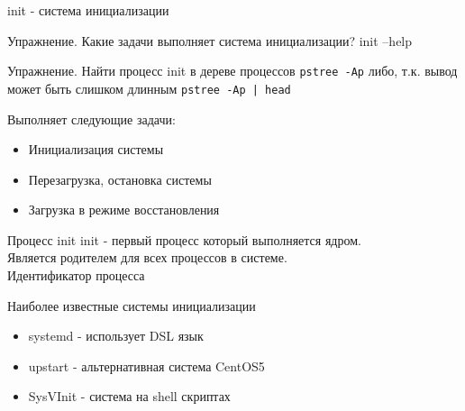 \begin{frame}{init - система инициализации}


\begin{block}{Упражнение. Какие задачи выполняет система инициализации?}
init --help
\end{block}

\begin{block}{Упражнение. Найти процесс init в дереве процессов}
{\tt pstree -Ap}
либо, т.к. вывод может быть слишком длинным
{\tt pstree -Ap | head}
\end{block}

\pause
 Выполняет следующие задачи:
\begin{itemize}
    \item Инициализация системы
    \item Перезагрузка, остановка системы
    \item Загрузка в режиме восстановления 
\end{itemize}
\end{frame}

\begin{frame}{Процесс init}
\alert{init} - первый процесс который выполняется ядром. \\
        Является родителем для всех процессов в системе. \\
        Идентификатор процесса

	\begin{block}{Наиболее известные системы инициализации}
		\begin{itemize}
			\item systemd - использует DSL язык
			\item upstart - альтернативная система CentOS5 
			\item SysVInit - система на shell скриптах
		\end{itemize}
	\end{block}
    
\end{frame}

